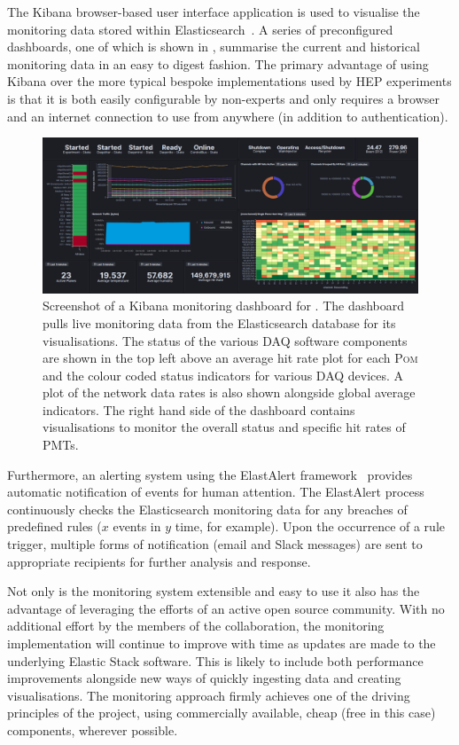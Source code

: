 The Kibana browser-based user interface application is used to visualise the monitoring data
stored within Elasticsearch~\cite{kibana2020}. A series of preconfigured dashboards, one of which
is shown in , summarise the current and historical monitoring data in an
easy to digest fashion. The primary advantage of using Kibana over the more typical bespoke
implementations used by HEP experiments is that it is both easily configurable by non-experts and
only requires a browser and an internet connection to use from anywhere (in addition to
authentication).

\begin{figure} %
    \includegraphics[width=\textwidth]{diagrams/5-daq/monitoring.pdf}
    \caption[Screenshot of a Kibana monitoring dashboard for \chipsfive]
    {Screenshot of a Kibana monitoring dashboard for \chipsfive. The dashboard pulls live
    monitoring data from the Elasticsearch database for its visualisations. The status of the
    various DAQ software components are shown in the top left above an average hit rate plot for
    each \textsc{Pom} and the colour coded status indicators for various DAQ devices. A plot of
    the network data rates is also shown alongside global average indicators. The right hand side
    of the dashboard contains visualisations to monitor the overall status and specific hit rates
    of PMTs.}
    \label{fig:monitoring}
\end{figure}

Furthermore, an alerting system using the ElastAlert framework~\cite{elastalert2020} provides
automatic notification of events for human attention. The ElastAlert process continuously checks
the Elasticsearch monitoring data for any breaches of predefined rules ($x$ events in $y$ time,
for example). Upon the occurrence of a rule trigger, multiple forms of notification (email and
Slack messages) are sent to appropriate recipients for further analysis and response.

Not only is the \chipsfive monitoring system extensible and easy to use it also has the advantage
of leveraging the efforts of an active open source community. With no additional effort by the
members of the \chips collaboration, the monitoring implementation will continue to improve with
time as updates are made to the underlying Elastic Stack software. This is likely to include both
performance improvements alongside new ways of quickly ingesting data and creating visualisations.
The monitoring approach firmly achieves one of the driving principles of the \chips project, using
commercially available, cheap (free in this case) components, wherever possible.